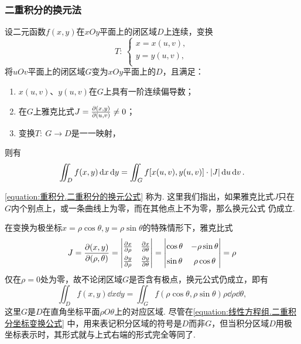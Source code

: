 \subsubsection{二重积分的换元法}
\begin{theorem}
设二元函数\(f(x,y)\)在\(xOy\)平面上的闭区域\(D\)上连续，变换\[
T :\: \left\{ \begin{array}{l}
x = x(u,v), \\
y = y(u,v), \\
\end{array} \right.
\]将\(uOv\)平面上的闭区域\(G\)变为\(xOy\)平面上的\(D\)，且满足：
\begin{enumerate}
\item \(x(u,v)\)、\(y(u,v)\)在\(G\)上具有一阶连续偏导数；
\item 在\(G\)上雅克比式\(J = \pdv{ (x,y) }{ (u,v) } \neq 0\)；
\item 变换\(T :\: G \to D\)是一一映射，%
\end{enumerate}
则有\begin{equation}\label{equation:重积分.二重积分的换元公式}
\iint_D f(x,y) \dd{x} \dd{y}
=\iint_G f[x(u,v),y(u,v)] \cdot \abs{J} \dd{u} \dd{v}.
\end{equation}
\end{theorem}
\cref{equation:重积分.二重积分的换元公式} 称为.
这里我们指出，如果雅克比式\(J\)只在\(G\)内个别点上，或一条曲线上为零，而在其他点上不为零，那么换元公式  仍成立.

\vspace{1cm}

在变换为极坐标\(x = \rho \cos\theta, y = \rho \sin\theta\)的特殊情形下，雅克比式\[
J = \jacobi{x,y}{\rho,\theta}
= {\def\arraystretch{1.5}
\begin{vmatrix}
\pdv{x}{\rho} & \pdv{x}{\theta} \\
\pdv{y}{\rho} & \pdv{y}{\theta}
\end{vmatrix}}
= \begin{vmatrix}
\cos\theta & -\rho \sin\theta \\
\sin\theta & \rho \cos\theta
\end{vmatrix}
= \rho
\]仅在\(\rho = 0\)处为零，故不论闭区域\(G\)是否含有极点，换元公式仍成立，即有\[
\iint_D f(x,y) \dd{x} \dd{y}
= \iint_G f(\rho \cos\theta,\rho \sin\theta) \rho \dd{\rho} \dd{\theta},
\]这里\(G\)是\(D\)在直角坐标平面\(\rho O \theta\)上的对应区域.
尽管在\cref{equation:线性方程组.二重积分坐标变换公式} 中，用来表记积分区域的符号是\(D\)而非\(G\)，但当积分区域\(D\)用极坐标表示时，其形式就与上式右端的形式完全等同了.

